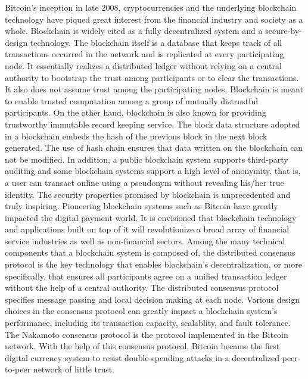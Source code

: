 

Bitcoin's inception in late 2008, cryptocurrencies and the underlying blockchain technology have piqued great interest from the financial industry and society as a whole.
Blockchain is widely cited as a fully decentralized system and a secure-by-design technology. The blockchain itself is a database that keeps track of all transactions occurred in the network and is replicated at every participating node. It essentially realizes a distributed ledger without relying on a central authority to bootstrap the trust among participants or to clear the transactions. It also does not assume trust among the participating nodes. Blockchain is meant to enable trusted computation among a group of mutually distrustful participants. On the other hand, blockchain is also known for providing trustworthy immutable record keeping service. The block data structure adopted in a blockchain embeds the hash of the previous block in the next block generated. The use of hash chain ensures that data written on the blockchain can not be modified. In addition, a public blockchain system supports third-party auditing and some blockchain systems support a high level of anonymity, that is, a user can transact online using a pseudonym without revealing his/her true identity. 
The security properties promised by blockchain is unprecedented and truly inspiring. Pioneering blockchain systems such as Bitcoin have greatly impacted the digital payment world. It is envisioned that blockchain technology and applications built on top of it will revolutionize a broad array of financial service industries as well as non-financial sectors. 
Among the many technical components that a blockchain system is composed of, the distributed consensus protocol is the key technology that enables blockchain's decentralization, or more specifically, that ensures all participants agree on a unified transaction ledger without the help of a central authority. The distributed consensus protocol specifies message passing and local decision making at each node. Various design choices in the consensus protocol can greatly impact a blockchain system's performance, including its transaction capacity, scalablity, and fault tolerance. 
The Nakamoto consensus protocol  is the protocol implemented in the Bitcoin network. With the help of this consensus protocol, Bitcoin became the first digital currency system to resist double-spending attacks in a decentralized peer-to-peer network of little trust.
